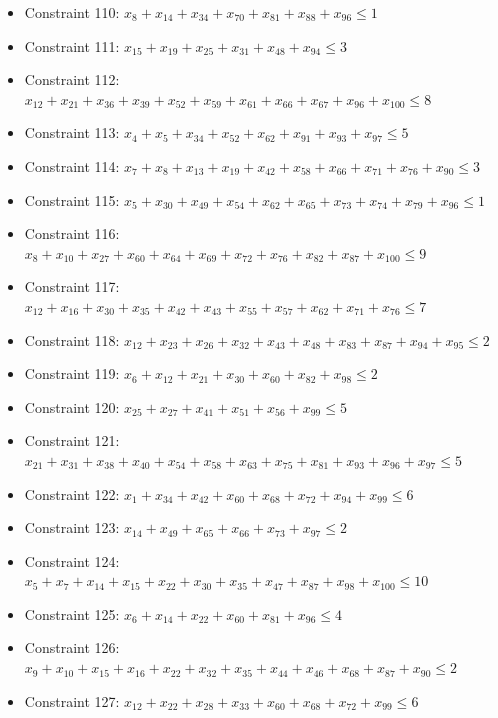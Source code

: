 \documentclass[11pt]{article}
\begin{document}
\begin{itemize}
\item Constraint 110: $x_{8} + x_{14} + x_{34} + x_{70} + x_{81} + x_{88} + x_{96} \le 1$
\item Constraint 111: $x_{15} + x_{19} + x_{25} + x_{31} + x_{48} + x_{94} \le 3$
\item Constraint 112: $x_{12} + x_{21} + x_{36} + x_{39} + x_{52} + x_{59} + x_{61} + x_{66} + x_{67} + x_{96} + x_{100} \le 8$
\item Constraint 113: $x_{4} + x_{5} + x_{34} + x_{52} + x_{62} + x_{91} + x_{93} + x_{97} \le 5$
\item Constraint 114: $x_{7} + x_{8} + x_{13} + x_{19} + x_{42} + x_{58} + x_{66} + x_{71} + x_{76} + x_{90} \le 3$
\item Constraint 115: $x_{5} + x_{30} + x_{49} + x_{54} + x_{62} + x_{65} + x_{73} + x_{74} + x_{79} + x_{96} \le 1$
\item Constraint 116: $x_{8} + x_{10} + x_{27} + x_{60} + x_{64} + x_{69} + x_{72} + x_{76} + x_{82} + x_{87} + x_{100} \le 9$
\item Constraint 117: $x_{12} + x_{16} + x_{30} + x_{35} + x_{42} + x_{43} + x_{55} + x_{57} + x_{62} + x_{71} + x_{76} \le 7$
\item Constraint 118: $x_{12} + x_{23} + x_{26} + x_{32} + x_{43} + x_{48} + x_{83} + x_{87} + x_{94} + x_{95} \le 2$
\item Constraint 119: $x_{6} + x_{12} + x_{21} + x_{30} + x_{60} + x_{82} + x_{98} \le 2$
\item Constraint 120: $x_{25} + x_{27} + x_{41} + x_{51} + x_{56} + x_{99} \le 5$
\item Constraint 121: $x_{21} + x_{31} + x_{38} + x_{40} + x_{54} + x_{58} + x_{63} + x_{75} + x_{81} + x_{93} + x_{96} + x_{97} \le 5$
\item Constraint 122: $x_{1} + x_{34} + x_{42} + x_{60} + x_{68} + x_{72} + x_{94} + x_{99} \le 6$
\item Constraint 123: $x_{14} + x_{49} + x_{65} + x_{66} + x_{73} + x_{97} \le 2$
\item Constraint 124: $x_{5} + x_{7} + x_{14} + x_{15} + x_{22} + x_{30} + x_{35} + x_{47} + x_{87} + x_{98} + x_{100} \le 10$
\item Constraint 125: $x_{6} + x_{14} + x_{22} + x_{60} + x_{81} + x_{96} \le 4$
\item Constraint 126: $x_{9} + x_{10} + x_{15} + x_{16} + x_{22} + x_{32} + x_{35} + x_{44} + x_{46} + x_{68} + x_{87} + x_{90} \le 2$
\item Constraint 127: $x_{12} + x_{22} + x_{28} + x_{33} + x_{60} + x_{68} + x_{72} + x_{99} \le 6$

\end{itemize}
\end{document}
